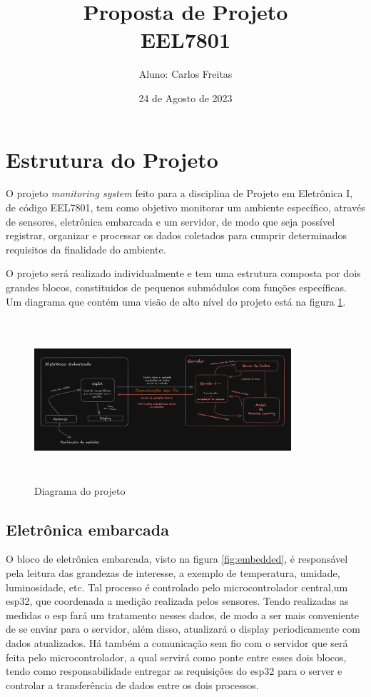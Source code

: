 \documentclass{article}
\title{Proposta de Projeto\\ {\Large EEL7801}}
\author{Aluno: Carlos Freitas}
\date{24 de Agosto de 2023}
\begin{document}
\maketitle

\section*{Estrutura do Projeto}

O projeto \textit{monitoring system} feito para a disciplina de
Projeto em Eletrônica I, de código EEL7801, tem como objetivo monitorar
um ambiente específico, através de sensores, eletrônica embarcada e um servidor, de modo
que seja possível registrar, organizar e processar os dados coletados para
cumprir determinados requisitos da finalidade do ambiente.

O projeto será realizado individualmente e tem uma estrutura composta
por dois grandes blocos, constituidos de pequenos submódulos com funções específicas.
Um diagrama que contém uma visão de alto nível do projeto está na figura \ref{fig:diagramtoplevel}.

\begin{figure}[ht]
	\centering
	\includegraphics[width=0.85\textwidth,height=6cm]{diagramaprojetoI.png}
	\caption{Diagrama do projeto}
	\label{fig:diagramtoplevel}
\end{figure}

\subsection*{Eletrônica embarcada}

O bloco de eletrônica embarcada, visto na figura \ref{fig:embedded}, é responsável pela leitura das grandezas de interesse,
a exemplo de temperatura, umidade, luminosidade, etc. Tal processo é controlado pelo
microcontrolador central,um esp32, que coordenada a medição realizada pelos sensores. Tendo realizadas as medidas
o esp fará um tratamento nesses dados, de modo a ser mais conveniente de se enviar para o servidor,
além disso, atualizará o display periodicamente com dados atualizados. Há também a comunicação sem fio
com o servidor que será feita pelo microcontrolador, a qual servirá como ponte entre esses dois
blocos, tendo como responsabilidade entregar as requisições do esp32 para o server e controlar a
transferência de dados entre os dois processos.
\end{document}
